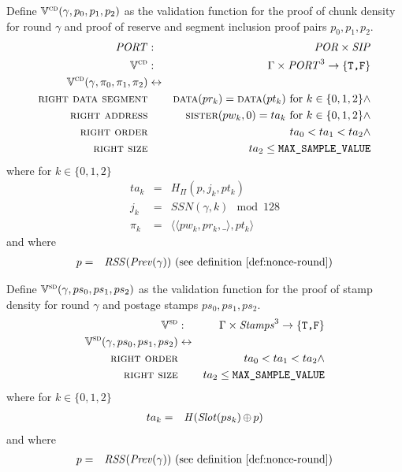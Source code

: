 \begin{definition}
\label{def:chunk-density-validition}
%
Define $\mathbb{V}^{\textsc{cd}}(\gamma, p_0,p_1,p_2)$ as the validation function for the proof of chunk density for round $\gamma$ and proof of reserve and segment inclusion proof pairs $p_0,p_1,p_2$.
%
\begin{eqnarray}
\mathit{PORT}&:&\mathit{POR}\times\mathit{SIP}\\
\mathbb{V}^{\textsc{cd}}&:&\Gamma\times\mathit{PORT}^3\to\{\texttt{T,F}\}\\
\mathbb{V}^{\textsc{cd}}(\gamma, \pi_0,\pi_1,\pi_2)&\leftrightarrow&\\
\textsc{right data segment}&&   \textsc{data}(pr_k)= \textsc{data}(pt_k)\text{ for }k\in\{0,1,2\}\land\\
\textsc{right address}&& \textsc{sister}(pw_k,0)=ta_k\text{ for }k\in\{0,1,2\}\land\\
\textsc{right order}&& ta_0<ta_1<ta_2\land\\
\textsc{right size}&& ta_2\leq\texttt{MAX\_SAMPLE\_VALUE}
\end{eqnarray}
where  for $k\in\{0,1,2\}$
\begin{eqnarray}
ta_k& = & \mathit{H}_{\Pi}(p,j_k,pt_k)\\
j_k& = &\mathit{SSN}(\gamma,k)\mod 128\\
\pi_k&=& \langle\langle pw_k, pr_k, \_\rangle, pt_k\rangle
\end{eqnarray}
and where
\begin{eqnarray}
p & = & \mathit{RSS}(\mathit{Prev}(\gamma)) \text{ (see definition \ref{def:nonce-round})}
\end{eqnarray}
\end{definition}

\begin{definition}
\label{def:stamp-density-validition}
%
Define $\mathbb{V}^{\textsc{sd}}(\gamma, ps_0,ps_1,ps_2)$ as the validation function for the proof of stamp density for round $\gamma$ and postage stamps $ps_0,ps_1,ps_2$.
%
\begin{eqnarray}
\mathbb{V}^{\textsc{sd}}&:&\Gamma\times\mathit{Stamps}^3\to\{\texttt{T,F}\}\\
\mathbb{V}^{\textsc{sd}}(\gamma, ps_0,ps_1,ps_2)&\leftrightarrow &\\ 
\textsc{right order}&& ta_0<ta_1<ta_2\land\\
\textsc{right size}&& ta_2\leq\texttt{MAX\_SAMPLE\_VALUE}
\end{eqnarray}
where for $k\in\{0,1,2\}$
\begin{eqnarray}
ta_k& =& \mathit{H}(\mathit{Slot}(ps_k)\operatorname{\operatorname{\oplus}} p)
\end{eqnarray}
and where
\begin{eqnarray}
p & = & \mathit{RSS}(\mathit{Prev}(\gamma)) \text{ (see definition \ref{def:nonce-round})}
\end{eqnarray}
\end{definition}


